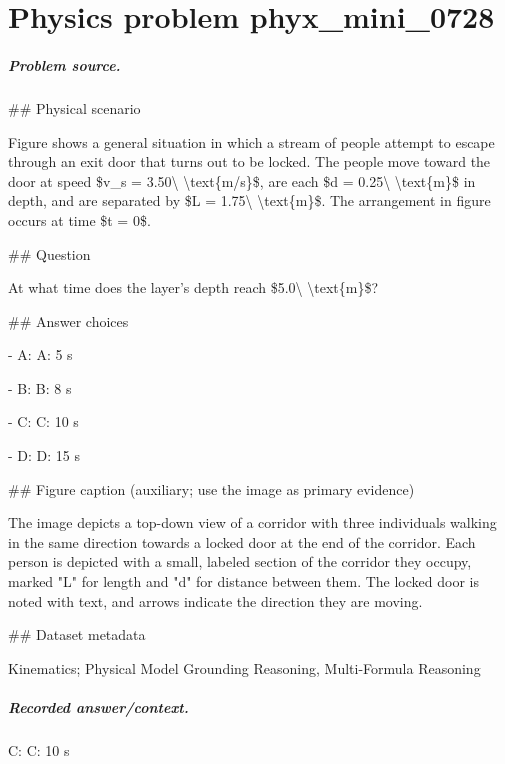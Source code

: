 
\chapter{Physics problem phyx\_mini\_0728}
\label{ch:PhyXMiniProblems_problem_phyx_mini_0728}

\paragraph{Problem source.}
\#\# Physical scenario

Figure shows a general situation in which a stream of people attempt to escape through an exit door that turns out to be locked. The people move toward the door at speed \$v\_s = 3.50\textbackslash{} \textbackslash{}text\{m/s\}\$, are each \$d = 0.25\textbackslash{} \textbackslash{}text\{m\}\$ in depth, and are separated by \$L = 1.75\textbackslash{} \textbackslash{}text\{m\}\$. The arrangement in figure occurs at time \$t = 0\$.

\#\# Question

At what time does the layer's depth reach \$5.0\textbackslash{} \textbackslash{}text\{m\}\$?

\#\# Answer choices

- A: A: 5 s

- B: B: 8 s

- C: C: 10 s

- D: D: 15 s

\#\# Figure caption (auxiliary; use the image as primary evidence)

The image depicts a top-down view of a corridor with three individuals walking in the same direction towards a locked door at the end of the corridor. Each person is depicted with a small, labeled section of the corridor they occupy, marked "L" for length and "d" for distance between them. The locked door is noted with text, and arrows indicate the direction they are moving.

\#\# Dataset metadata

Kinematics; Physical Model Grounding Reasoning, Multi-Formula Reasoning

\paragraph{Recorded answer/context.}
C: C: 10 s

